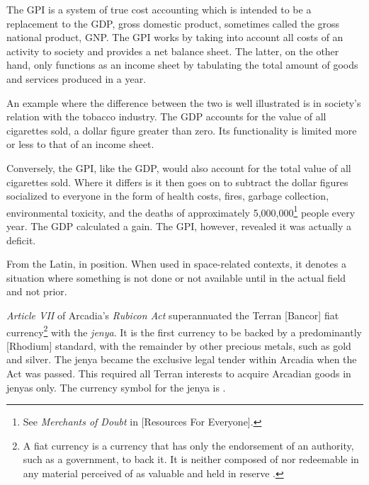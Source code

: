 The GPI is a system of true cost accounting which is intended to be a replacement to the GDP, gross domestic product, sometimes called the gross national product, GNP. The GPI works by taking into account all costs of an activity to society and provides a net balance sheet. The latter, on the other hand, only functions as an income sheet by tabulating the total amount of goods and services produced in a year. 

An example where the difference between the two is well illustrated is in society's relation with the tobacco industry. The GDP accounts for the value of all cigarettes sold, a dollar figure greater than zero. Its functionality is limited more or less to that of an income sheet.

Conversely, the GPI, like the GDP, would also account for the total value of all cigarettes sold. Where it differs is it then goes on to subtract the dollar figures socialized to everyone in the form of health costs, fires, garbage collection, environmental toxicity, and the deaths of approximately 5,000,000\footnote{See {\it Merchants of Doubt} in [Resources For Everyone].} people every year. The GDP calculated a gain. The GPI, however, revealed it was actually a deficit.
\stopdefinition

From the Latin, in position. When used in space-related contexts, it denotes a situation where something is not done or not available until in the actual field and not prior.
\stopdefinition

{\it Article VII} of Arcadia's {\it Rubicon Act} superannuated the Terran [Bancor] fiat currency\footnote{A fiat currency is a currency that has only the endorsement of an authority, such as a government, to back it. It is neither composed of nor redeemable in any material perceived of as valuable and held in reserve .} with the {\it jenya}. It is the first currency to be backed by a predominantly [Rhodium] standard, with the remainder by other precious metals, such as gold and silver. The jenya became the exclusive legal tender within Arcadia when the Act was passed. This required all Terran interests to acquire Arcadian goods in jenyas only. The currency symbol for the jenya is .

